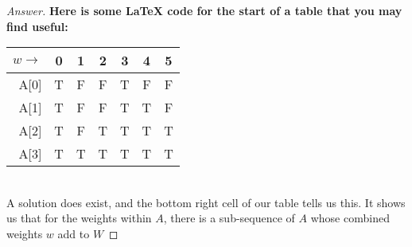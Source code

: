 \documentclass[11pt]{article}
\theoremstyle{definition}
\theoremstyle{definition}
\theoremstyle{definition}
\begin{document}
\begin{proof}[Answer]
\textbf{Here is some LaTeX code for the start of a table that you may find useful:}

\begin{tabular}{|r|c|c|c|c|c|c|}
\hline
$w \rightarrow$&0 & 1 & 2 & 3 & 4 & 5  \\ \hline
A[0]      & T & F & F & T & F & F  \\ \hline
A[1]      & T & F & F & T & T & F  \\ \hline
A[2]      & T & F & T & T & T & T  \\ \hline
A[3]      & T & T & T & T & T & T  \\ \hline
\end{tabular}\\

A solution does exist, and the bottom right cell of our table tells us this. It shows us that for the weights within $A$, there is a sub-sequence of $A$ whose combined weights $w$ add to $W$ 


\end{proof}

\end{document}
